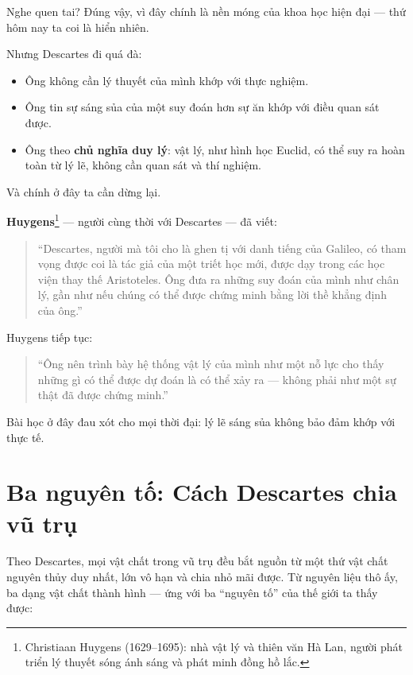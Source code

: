 Nghe quen tai? Đúng vậy, vì đây chính là nền móng của khoa học hiện đại — thứ hôm nay ta coi là hiển nhiên.

Nhưng Descartes đi quá đà:

\begin{itemize}
  \item Ông không cần lý thuyết của mình khớp với thực nghiệm.
  \item Ông tin sự sáng sủa của một suy đoán hơn sự ăn khớp với điều quan sát được.
  \item Ông theo \textbf{chủ nghĩa duy lý}: vật lý, như hình học Euclid, có thể suy ra hoàn toàn từ lý lẽ, không cần quan sát và thí nghiệm.
\end{itemize}

Và chính ở đây ta cần dừng lại.

\textbf{Huygens}\footnote{Christiaan Huygens (1629--1695): nhà vật lý và thiên văn Hà Lan, người phát triển lý thuyết sóng ánh sáng và phát minh đồng hồ lắc.} — người cùng thời với Descartes — đã viết:

\begin{quote}
“Descartes, người mà tôi cho là ghen tị với danh tiếng của Galileo, có tham vọng được coi là tác giả của một triết học mới, được dạy trong các học viện thay thế Aristoteles. Ông đưa ra những suy đoán của mình như chân lý, gần như nếu chúng có thể được chứng minh bằng lời thề khẳng định của ông.”
\end{quote}

Huygens tiếp tục:

\begin{quote}
“Ông nên trình bày hệ thống vật lý của mình như một nỗ lực cho thấy những gì có thể được dự đoán là có thể xảy ra — không phải như một sự thật đã được chứng minh.”
\end{quote}

Bài học ở đây đau xót cho mọi thời đại: lý lẽ sáng sủa không bảo đảm khớp với thực tế.


\section{Ba nguyên tố: Cách Descartes chia vũ trụ}

Theo Descartes, mọi vật chất trong vũ trụ đều bắt nguồn từ một thứ vật chất nguyên thủy duy nhất, lớn vô hạn và chia nhỏ mãi được. Từ nguyên liệu thô ấy, ba dạng vật chất thành hình — ứng với ba “nguyên tố” của thế giới ta thấy được:

